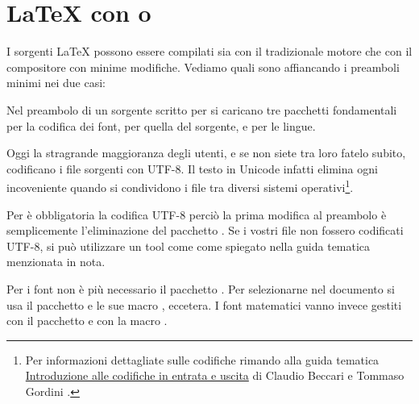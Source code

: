 \section{\LaTeX{} con  o }
\label{iSecPassareALuaTeX}

I sorgenti \LaTeX{} possono essere compilati sia con il tradizionale motore
 che con il compositore  con minime modifiche.
Vediamo quali sono affiancando i preamboli minimi nei due casi:\\
\begin{tcolorbox}[width=(\linewidth/2-1mm),equal height group=A,nobeforeafter]
\end{tcolorbox}
%
\begin{tcolorbox}[width=(\linewidth/2-1mm),equal height group=A,nobeforeafter]
\end{tcolorbox}

Nel preambolo di un sorgente scritto per  si caricano tre
pacchetti fondamentali  per la codifica dei font, 
per quella del sorgente, e  per le lingue.

Oggi la stragrande maggioranza degli utenti, e se non siete tra loro fatelo
subito, codificano i file sorgenti con UTF-8. Il testo in Unicode infatti
elimina ogni incoveniente quando si condividono i file tra diversi sistemi
operativi\footnote{Per informazioni dettagliate sulle codifiche rimando alla
guida tematica \GuIT{}
\href{http://www.guitex.org/home/images/doc/GuideGuIT/introcodifiche.pdf}{%
Introduzione alle codifiche in entrata e uscita} di Claudio Beccari e Tommaso
Gordini \cite{gt:codifiche}.}.

Per \LuaTeX{} è obbligatoria la codifica UTF-8 perciò la prima modifica al
preambolo è semplicemente l'eliminazione del pacchetto . Se i
vostri file non fossero codificati UTF-8, si può utilizzare un tool come
 come spiegato nella guida tematica menzionata in nota.

Per i font non è più necessario il pacchetto . Per selezionarne
nel documento si usa il pacchetto  e le sue macro
,  eccetera. I font matematici vanno invece
gestiti con il pacchetto  e con la macro .

